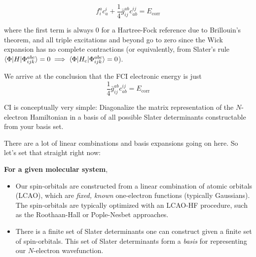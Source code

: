 \documentclass{article}
\newcommand{\Ecorr}{E_{\mathrm{corr}}}
\newcommand{\Hc}{H_{\mathrm{c}}}
\begin{document}
\[ f_i^a c_a^i + \frac{1}{4} \bar{g}_{ij}^{ab} c_{ab}^{ij} = \Ecorr \]

where the first term is always 0 for a Hartree-Fock reference due to Brillouin's theorem, and all triple excitations and beyond go to zero 
since the Wick expansion has no complete contractions (or equivalently, from Slater's rule $\braket{\Phi | H | \Phi_{ijk}^{abc}} = 0  \implies \braket{\Phi | \Hc | \Phi_{ijk}^{abc}} = 0 $).

We arrive at the conclusion that the FCI electronic energy is just
\[ \frac{1}{4} \bar{g}_{ij}^{ab} c_{ab}^{ij} = \Ecorr \]





%
%
%
%



CI is conceptually very simple: Diagonalize the matrix representation of the $N$-electron Hamiltonian in a basis of all possible Slater determinants constructable from your basis set.

There are a lot of linear combinations and basis expansions going on here. So let's set that straight right now:

\textbf{For a given molecular system},
\begin{itemize}
\item Our spin-orbitals are constructed from a linear combination of atomic orbitals (LCAO), which are \textit{fixed, known} one-electron functions (typically Gaussians). 
The spin-orbitals are typically optimized with an LCAO-HF procedure, such as the Roothaan-Hall or Pople-Nesbet approaches. 
\item There is a finite set of Slater determinants one can construct given a finite set of spin-orbitals. This set of Slater determinants form a \textit{basis} for representing our $N$-electron wavefunction.
\end{itemize}
\end{document}
